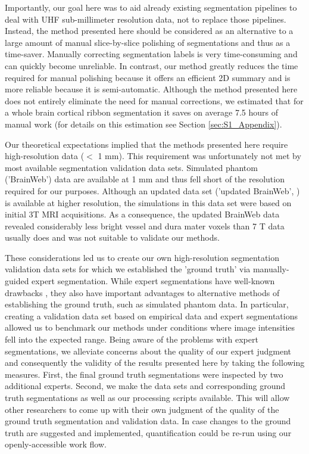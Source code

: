 Importantly, our goal here was to aid already existing segmentation pipelines to deal with UHF sub-millimeter resolution data, not to replace those pipelines. Instead, the method presented here should be considered as an alternative to a large amount of manual slice-by-slice polishing of segmentations and thus as a time-saver. Manually correcting segmentation labels is very time-consuming and can quickly become unreliable. In contrast, our method greatly reduces the time required for manual polishing because it offers an efficient 2D summary and is more reliable because it is semi-automatic. Although the method presented here does not entirely eliminate the need for manual corrections, we estimated that for a whole brain cortical ribbon segmentation it saves on average 7.5 hours of manual work (for details on this estimation see Section \ref{sec:S1_Appendix}).

Our theoretical expectations implied that the methods presented here require high-resolution data ($<$ 1 mm). This requirement was unfortunately not met by most available segmentation validation data sets. Simulated phantom ('BrainWeb') data \parencite{Collins1998} are available at 1 mm and thus fell short of the resolution required for our purposes. Although an updated data set ('updated BrainWeb', \cite{AubertBroche2006a,AubertBroche2006b}) is available at higher resolution, the simulations in this data set were based on initial 3T MRI acquisitions. As a consequence, the updated BrainWeb data revealed considerably less bright vessel and dura mater voxels than 7 T data usually does and was not suitable to validate our methods.

These considerations led us to create our own high-resolution segmentation validation data sets for which we established the 'ground truth' via manually-guided expert segmentation. While expert segmentations have well-known drawbacks \parencite{Despotovic2015, Valverde2015}, they also have important advantages to alternative methods of establishing the ground truth, such as simulated phantom data. In particular, creating a validation data set based on empirical data and expert segmentations allowed us to benchmark our methods under conditions where image intensities fell into the expected range. Being aware of the problems with expert segmentations, we alleviate concerns about the quality of our expert judgment and consequently the validity of the results presented here by taking the following measures. First, the final ground truth segmentations were inspected by two additional experts. Second, we make the data sets and corresponding ground truth segmentations as well as our processing scripts available. This will allow other researchers to come up with their own judgment of the quality of the ground truth segmentation and validation data. In case changes to the ground truth are suggested and implemented, quantification could be re-run using our openly-accessible work flow. 

